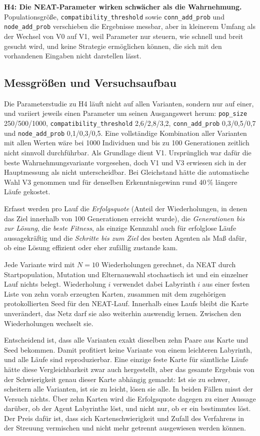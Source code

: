 \documentclass[sigconf]{acmart}
\begin{document}
\textbf{H4: Die NEAT-Parameter wirken schwächer als die Wahrnehmung.} Populationsgröße, \texttt{compatibility\_\allowbreak threshold} sowie \texttt{conn\_add\_prob} und \texttt{node\_add\_prob} verschieben die Ergebnisse messbar, aber in kleinerem Umfang als der Wechsel von V0 auf V1, weil Parameter nur steuern, wie schnell und breit gesucht wird, und keine Strategie ermöglichen können, die sich mit den vorhandenen Eingaben nicht darstellen lässt.

\subsection{Messgrößen und Versuchsaufbau}
Die Parameterstudie zu H4 läuft nicht auf allen Varianten, sondern nur auf einer, und variiert jeweils einen Parameter um seinen Ausgangswert herum: \texttt{pop\_size} 250/500/1000, \texttt{compatibility\_}\allowbreak\texttt{threshold} 2,6/2,8/3,2, \texttt{conn\_\allowbreak add\_\allowbreak prob} 0,3/0,5/0,7 und \texttt{node\_\allowbreak add\_\allowbreak prob} 0,1/0,3/0,5. Eine vollständige Kombination aller Varianten mit allen Werten wäre bei 1000 Individuen und bis zu 100 Generationen zeitlich nicht sinnvoll durchführbar. Als Grundlage dient V1. Ursprünglich war dafür die beste Wahrnehmungsvariante vorgesehen, doch V1 und V3 erwiesen sich in der Hauptmessung als nicht unterscheidbar. Bei Gleichstand hätte die automatische Wahl V3 genommen und für denselben Erkenntnisgewinn rund 40\,\% längere Läufe gekostet.

Erfasst werden pro Lauf die \emph{Erfolgsquote} (Anteil der Wiederholungen, in denen das Ziel innerhalb von 100 Generationen erreicht wurde), die \emph{Generationen bis zur Lösung}, die \emph{beste Fitness}, als einzige Kennzahl auch für erfolglose Läufe aussagekräftig und die \emph{Schritte bis zum Ziel} des besten Agenten als Maß dafür, ob eine Lösung effizient oder eher zufällig zustande kam.

Jede Variante wird mit $N=10$ Wiederholungen gerechnet, da NEAT durch Startpopulation, Mutation und Elternauswahl stochastisch ist und ein einzelner Lauf nichts belegt. Wiederholung $i$ verwendet dabei Labyrinth $i$ aus einer festen Liste von zehn vorab erzeugten Karten, zusammen mit dem zugehörigen protokollierten Seed für den NEAT-Lauf. Innerhalb eines Laufs bleibt die Karte unverändert, das Netz darf sie also weiterhin auswendig lernen. Zwischen den Wiederholungen wechselt sie.

Entscheidend ist, dass alle Varianten exakt dieselben zehn Paare aus Karte und Seed bekommen. Damit profitiert keine Variante von einem leichteren Labyrinth, und alle Läufe sind reproduzierbar. Eine einzige feste Karte für sämtliche Läufe hätte diese Vergleichbarkeit zwar auch hergestellt, aber das gesamte Ergebnis von der Schwierigkeit genau dieser Karte abhängig gemacht: Ist sie zu schwer, scheitern alle Varianten, ist sie zu leicht, lösen sie alle. In beiden Fällen misst der Versuch nichts. Über zehn Karten wird die Erfolgsquote dagegen zu einer Aussage darüber, ob der Agent Labyrinthe löst, und nicht nur, ob er ein bestimmtes löst. Der Preis dafür ist, dass sich Kartenschwierigkeit und Zufall des Verfahrens in der Streuung vermischen und nicht mehr getrennt ausgewiesen werden können.
\end{document}
